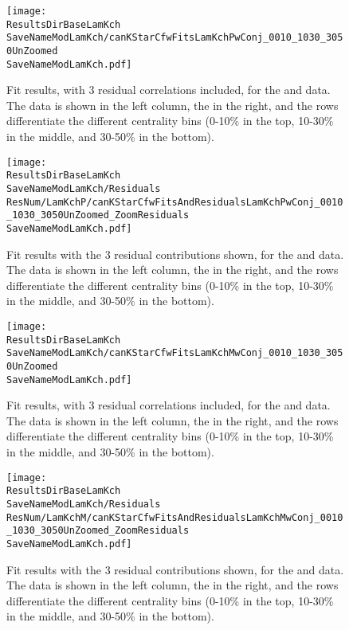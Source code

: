 \documentclass[/home/jesse/Analysis/FemtoAnalysis/AnalysisNotes/AnalysisNoteJBuxton.tex]{subfiles}
\renewcommand{\NonFlatBgdLamKch}{_NonFlatBgdCrctnLamK0LinearLamKchPolynomial}
\renewcommand{\ResNum}{_3Res}
\renewcommand{\PrimMaxDecay}{_PrimMaxDecay10fm}
\renewcommand{\SaveNameModLamKch}{\MomRes\NonFlatBgdLamKch\ResNum\PrimMaxDecay\ResMethod\ParamFixAndShareLamKch}
\begin{document}
\begin{figure}[h]
  \centering
  \texttt{[image: \\ResultsDirBaseLamKch\\SaveNameModLamKch/canKStarCfwFitsLamKchPwConj\_0010\_1030\_3050UnZoomed\\SaveNameModLamKch.pdf]}
  \caption[\LamKchPALamKchM data with fits: 3 residuals]
  {
  Fit results, with 3 residual correlations included, for the \LamKchP and \ALamKchM data.
  The \LamKchP data is shown in the left column, the \ALamKchM in the right, and the rows differentiate the different centrality bins (0-10\% in the top, 10-30\% in the middle, and 30-50\% in the bottom).
  }
  \label{figApp:LamKchPwConjFits_3Res}
\end{figure}


\begin{figure}[h]
  \centering
  \texttt{[image: \\ResultsDirBaseLamKch\\SaveNameModLamKch/Residuals\\ResNum/LamKchP/canKStarCfwFitsAndResidualsLamKchPwConj\_0010\_1030\_3050UnZoomed\_ZoomResiduals\\SaveNameModLamKch.pdf]}
  \caption[\LamKchPALamKchM fit contribution from residuals: 3 residuals]
  {
  Fit results with the 3 residual contributions shown, for the \LamKchP and \ALamKchM data.
  The \LamKchP data is shown in the left column, the \ALamKchM in the right, and the rows differentiate the different centrality bins (0-10\% in the top, 10-30\% in the middle, and 30-50\% in the bottom).
  }
  \label{figApp:LamKchPwConjFitsAndResiduals_3Res}
\end{figure}





\begin{figure}[h]
  \centering
  \texttt{[image: \\ResultsDirBaseLamKch\\SaveNameModLamKch/canKStarCfwFitsLamKchMwConj\_0010\_1030\_3050UnZoomed\\SaveNameModLamKch.pdf]}
  \caption[\LamKchMALamKchP data with fits: 3 residuals]
  {
  Fit results, with 3 residual correlations included, for the \LamKchM and \ALamKchP data.
  The \LamKchM data is shown in the left column, the \ALamKchP in the right, and the rows differentiate the different centrality bins (0-10\% in the top, 10-30\% in the middle, and 30-50\% in the bottom).
  }
  \label{figApp:LamKchMwConjFits_3Res}
\end{figure}


\begin{figure}[h]
  \centering
  \texttt{[image: \\ResultsDirBaseLamKch\\SaveNameModLamKch/Residuals\\ResNum/LamKchM/canKStarCfwFitsAndResidualsLamKchMwConj\_0010\_1030\_3050UnZoomed\_ZoomResiduals\\SaveNameModLamKch.pdf]}
  \caption[\LamKchMALamKchP fit contribution from residuals: 3 residuals]
  {
  Fit results with the 3 residual contributions shown, for the \LamKchM and \ALamKchP data.
  The \LamKchM data is shown in the left column, the \ALamKchP in the right, and the rows differentiate the different centrality bins (0-10\% in the top, 10-30\% in the middle, and 30-50\% in the bottom).
  }
  \label{figApp:LamKchMwConjFitsAndResiduals_3Res}
\end{figure}
\end{document}
